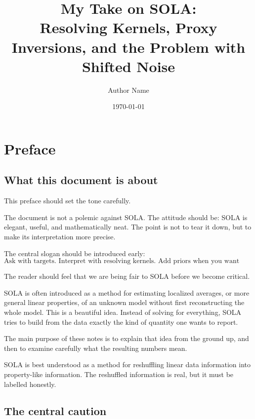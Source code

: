 \documentclass[11pt,openany]{book}
\title{
  My Take on SOLA:\\
  Resolving Kernels, Proxy Inversions, and the Problem with Shifted Noise
}
\author{Author Name}
\date{\today}
\theoremstyle{definition}
\theoremstyle{remark}
\begin{document}
\frontmatter

\maketitle
\tableofcontents


\chapter*{Preface}

\section*{What this document is about}

\begin{developmentnote}
This preface should set the tone carefully.

The document is not a polemic against SOLA. The attitude should be:
SOLA is elegant, useful, and mathematically neat. The point is not to tear it down, but to
make its interpretation more precise.

The central slogan should be introduced early:
\[
  \text{Ask with targets. Interpret with resolving kernels. Add priors when you want truth.}
\]

The reader should feel that we are being fair to SOLA before we become critical.
\end{developmentnote}

SOLA is often introduced as a method for estimating localized averages, or more general linear
properties, of an unknown model without first reconstructing the whole model. This is a
beautiful idea. Instead of solving for everything, SOLA tries to build from the data exactly the
kind of quantity one wants to report.

The main purpose of these notes is to explain that idea from the ground up, and then to examine
carefully what the resulting numbers mean.

\begin{lessonbox}
SOLA is best understood as a method for reshuffling linear data information into property-like
information. The reshuffled information is real, but it must be labelled honestly.
\end{lessonbox}

\section*{The central caution}
\end{document}
